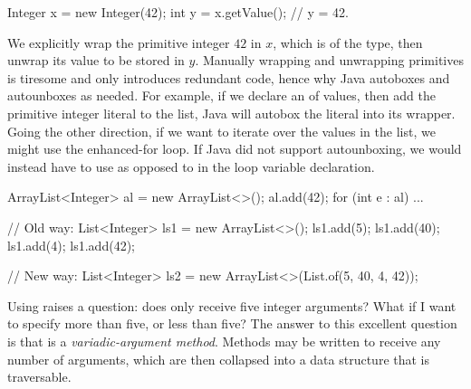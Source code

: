 \begin{verbnobox}[\small]
Integer x = new Integer(42);
int y = x.getValue(); // y = 42.
\end{verbnobox}

We explicitly wrap the primitive integer $42$ in $x$, which is of the  type, then unwrap its value to be stored in $y$. Manually wrapping and unwrapping primitives is tiresome and only introduces redundant code, hence why Java autoboxes and autounboxes as needed. For example, if we declare an  of  values, then add the primitive integer literal  to the list, Java will autobox the literal into its  wrapper. Going the other direction, if we want to iterate over the values in the list, we might use the enhanced-for loop. If Java did not support autounboxing, we would instead have to use  as opposed to  in the loop variable declaration. 

\begin{verbnobox}[\small]
ArrayList<Integer> al = new ArrayList<>();
al.add(42);
for (int e : al) {
  ...
}
\end{verbnobox}


\begin{verbnobox}[\small]
// Old way:
List<Integer> ls1 = new ArrayList<>();
ls1.add(5);
ls1.add(40);
ls1.add(4);
ls1.add(42);

// New way:
List<Integer> ls2 = new ArrayList<>(List.of(5, 40, 4, 42));
\end{verbnobox}
Using  raises a question: does  only receive five integer arguments? What if I want to specify more than five, or less than five? The answer to this excellent question is that  is a \textit{variadic-argument method}. Methods may be written to receive any number of arguments, which are then collapsed into a data structure that is traversable.


